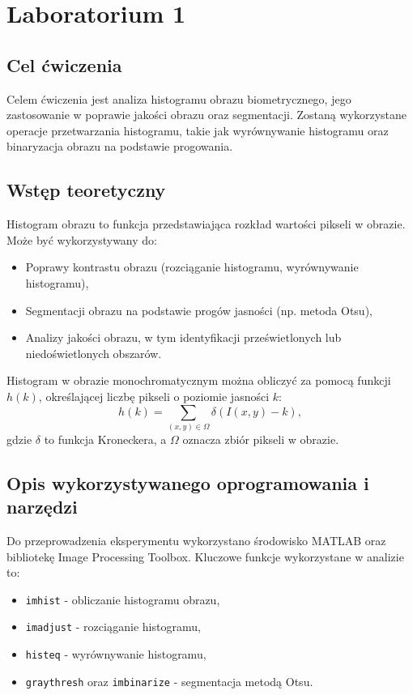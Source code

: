 \chapter{Laboratorium 1}
\label{cha:Lab001}
\makeatletter



\section{Cel ćwiczenia}
Celem ćwiczenia jest analiza histogramu obrazu biometrycznego, jego zastosowanie w poprawie jakości obrazu oraz segmentacji. Zostaną wykorzystane operacje przetwarzania histogramu, takie jak wyrównywanie histogramu oraz binaryzacja obrazu na podstawie progowania.

\section{Wstęp teoretyczny}
Histogram obrazu to funkcja przedstawiająca rozkład wartości pikseli w obrazie. Może być wykorzystywany do:
\begin{itemize}
    \item Poprawy kontrastu obrazu (rozciąganie histogramu, wyrównywanie histogramu),
    \item Segmentacji obrazu na podstawie progów jasności (np. metoda Otsu),
    \item Analizy jakości obrazu, w tym identyfikacji prześwietlonych lub niedoświetlonych obszarów.
\end{itemize}

Histogram w obrazie monochromatycznym można obliczyć za pomocą funkcji $h(k)$, określającej liczbę pikseli o poziomie jasności $k$:
\begin{equation}
h(k) = \sum_{(x,y) \in \Omega} \delta(I(x,y) - k),
\end{equation}
gdzie $\delta$ to funkcja Kroneckera, a $\Omega$ oznacza zbiór pikseli w obrazie.

\section{Opis wykorzystywanego oprogramowania i narzędzi}
Do przeprowadzenia eksperymentu wykorzystano środowisko MATLAB oraz bibliotekę Image Processing Toolbox. Kluczowe funkcje wykorzystane w analizie to:
\begin{itemize}
    \item \texttt{imhist} - obliczanie histogramu obrazu,
    \item \texttt{imadjust} - rozciąganie histogramu,
    \item \texttt{histeq} - wyrównywanie histogramu,
    \item \texttt{graythresh} oraz \texttt{imbinarize} - segmentacja metodą Otsu.
\end{itemize}

